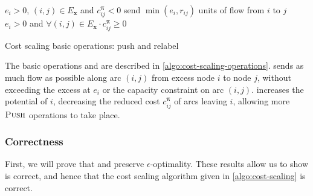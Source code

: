 \begin{algorithm}
\begin{algorithmic}[1]
    \Require $e_i > 0$, $(i,j) \in E_{\mathbf{x}}$ and $c^{\boldsymbol{\pi}}_{ij} < 0$
        \State send $\min\left(e_i, r_{ij}\right)$ units of flow from $i$ to $j$
    \EndFunction
    \setcounter{ALG@line}{0}
    \Statex
    \Require $e_i > 0$ and $\forall(i,j) \in E_{\mathbf{x}} \cdot c^{\boldsymbol{\pi}}_{ij} \geq 0$
    \EndFunction
\end{algorithmic}
\caption{Cost scaling basic operations: push and relabel}
\label{algo:cost-scaling-operations}
\end{algorithm}

The basic operations  and  are described in \cref{algo:cost-scaling-operations}.  sends as much flow as possible along arc $(i,j)$ from excess node $i$ to node $j$, without exceeding the excess at $e_i$ or the capacity constraint on arc $(i,j)$.  increases the potential of $i$, decreasing the reduced cost $c_{ij}^{\boldsymbol{\pi}}$ of arcs leaving $i$, allowing more $\textproc{Push}$ operations to take place.

\subsubsection{Correctness}

First, we will prove that  and  preserve $\epsilon$-optimality. These results allow us to show  is correct, and hence that the cost scaling algorithm given in \cref{algo:cost-scaling} is correct. \\

